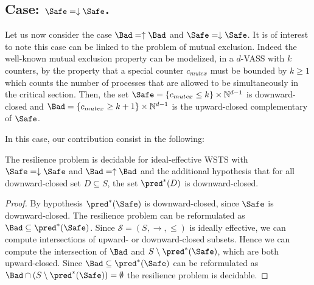 

\subsection{Case: $\Safe=\downarrow \Safe$.}
%
%

Let us now consider the case $\Bad=\uparrow \Bad$ and $\Safe=\downarrow \Safe$.
It is of interest to note this case can be linked to the problem of mutual exclusion.
Indeed the well-known mutual exclusion property can be modelized, in a $d$-VASS with $k$ counters, by the property that a special counter $c_{mutex}$ must be bounded by $k \geq 1$ which counts the number of processes that are allowed to be simultaneously in the critical section. Then, the set $\Safe =  \{c_{mutex} \leq k\} \times \mathbb{N}^{d-1}$ is downward-closed		and $\Bad =\{c_{mutex} \geq k+1\} \times  \mathbb{N}^{d-1} $ is the upward-closed complementary of $\Safe$. 

 In this case, our contribution consist in the following:



%
\begin{theorem}\label{up-down}
The resilience problem is decidable for ideal-effective WSTS with 
$\Safe=\downarrow \Safe$
and $\Bad=\uparrow \Bad$
and
the additional hypothesis that
for all downward-closed set $D \subseteq S$, the set $\pred^*(D)$ is downward-closed.
\end{theorem}

\begin{proof}
By hypothesis $\pred^*(\Safe)$ is downward-closed, since $\Safe$ is downward-closed.
The resilience problem can be reformulated as 
$\Bad \subseteq  \pred^*(\Safe)$.
Since $\mathscr{S}=(S,\rightarrow, \leq)$ is ideally effective, we can compute intersections of upward- or downward-closed 
 subsets.
Hence we can compute the intersection of
$\Bad$
and
$S \setminus \pred^*(\Safe)$,
which are both upward-closed.
Since
$\Bad \subseteq \pred^*(\Safe)$
can be reformulated as
$\Bad \cap (S \setminus \pred^*(\Safe)) = \emptyset$
the resilience problem is decidable.
\end{proof}

